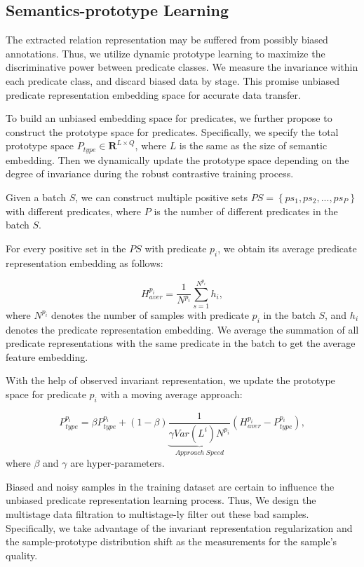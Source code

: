 \documentclass[letterpaper]{article} %
\begin{document}
\subsection{Semantics-prototype Learning}
\label{SPL}
The extracted relation representation may be suffered from possibly biased annotations. Thus, we utilize dynamic prototype learning to maximize the discriminative power between predicate classes. We measure the invariance within each predicate class, and discard biased data by stage. This promise unbiased predicate representation embedding space for accurate data transfer.

 To build an unbiased embedding space for predicates, we further propose to construct the prototype space for predicates. Specifically, we specify the total prototype space $ P_{type} \in \mathbf{R}^{L \times Q} $, where $ L $ is the same as the size of semantic embedding. Then we dynamically update the prototype space depending on the degree of invariance during the robust contrastive training process.

Given a batch $ S $, we can construct multiple positive sets $ PS=\left \{ ps_1,ps_2,...,ps_P \right \}  $ with different predicates, where $ P $ is the number of different predicates in the batch $ S $.

For every positive set in the $ PS $ with predicate $ p_i $, we obtain its average predicate representation embedding as follows:

\begin{equation}
    H_{aver}^{p_i}=\frac{1}{N^{p_i}} {\textstyle \sum_{s=1}^{N^{p_i}}} h_i,
\end{equation}
where $ N^{p_i} $ denotes the number of samples with predicate $ p_i $ in the batch $ S $, and $ h_i $ denotes the predicate representation embedding. We average the summation of all predicate representations with the same predicate in the batch to get the average feature embedding.

With the help of observed invariant representation, we update the prototype space for predicate $ p_i $ with a moving average approach:


\begin{equation}
    P_{type}^{p_i}=\beta P_{type}^{p_i}+(1-\beta) \underbrace{\frac{1}{ \gamma Var(L^{i})N^{p_i} }}_{Approach\;Speed} (H_{aver}^{p_i}-P_{type}^{p_i}),
\end{equation}
where $ \beta $ and $ \gamma $ are hyper-parameters.

\label{MDC}
Biased and noisy samples in the training dataset are certain to influence the unbiased predicate representation learning process. Thus, We design the multistage data filtration to multistage-ly filter out these bad samples. Specifically, we take advantage of the invariant representation regularization and the sample-prototype distribution shift as the measurements for the sample's quality.
\end{document}
